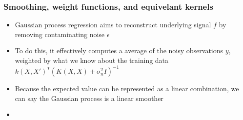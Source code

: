 \documentclass[12pt]{article}
\begin{document}



\subsubsection{Smoothing, weight functions, and equivelant kernels}
\begin{itemize}
    \item Gaussian process regression aims to reconstruct underlying signal $f$ by removing contaminating noise $\epsilon$ 
    \item To do this, it effectively computes a average of the noisy observations $y$, weighted by what we know about the training data $k(X, X')^T(K(X,X) + \sigma^2_nI)^{-1}$
    \item Because the expected value can be represented as a linear combination, we can say the Gaussian process is a linear smoother
    \item 
\end{itemize}
\end{document}
